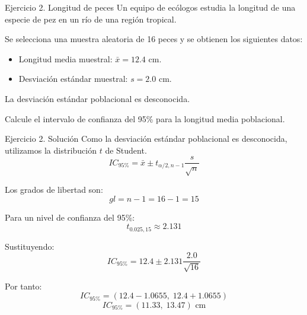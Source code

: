 \documentclass[aspectratio=169,11pt]{beamer}
\begin{document}
\begin{frame}{Ejercicio 2. Longitud de peces}
Un equipo de ecólogos estudia la longitud de una especie
de pez en un río de una región tropical.

Se selecciona una muestra aleatoria de 16 peces y se
obtienen los siguientes datos:

\begin{itemize}
    \item Longitud media muestral: $\bar{x}=12.4$ cm.
    \item Desviación estándar muestral: $s=2.0$ cm.
\end{itemize}

La desviación estándar poblacional es desconocida.

\medskip
\begin{alertblock}{}
    Calcule el intervalo de confianza del 95\% para
    la longitud media poblacional.
\end{alertblock}
\end{frame}

\begin{frame}{Ejercicio 2. Solución}
Como la desviación estándar poblacional es desconocida,
utilizamos la distribución $t$ de Student.
\vspace{-.2em}
\[
IC_{95\%}=\bar{x}\pm t_{\alpha/2,n-1}
\frac{s}{\sqrt{n}}
\]

Los grados de libertad son:
\vspace{-.2em}
\[
gl=n-1=16-1=15
\]

Para un nivel de confianza del 95\%:
\[
t_{0.025,15}\approx2.131
\]

Sustituyendo:
\[
IC_{95\%}=12.4\pm2.131\frac{2.0}{\sqrt{16}}
\]

Por tanto:
\[
IC_{95\%}=(12.4-1.0655,\;12.4+1.0655)
\]
\vspace{-1em}
\[
\boxed{IC_{95\%}=(11.33,\;13.47)\text{ cm}}
\]
\end{frame}

\end{document}
